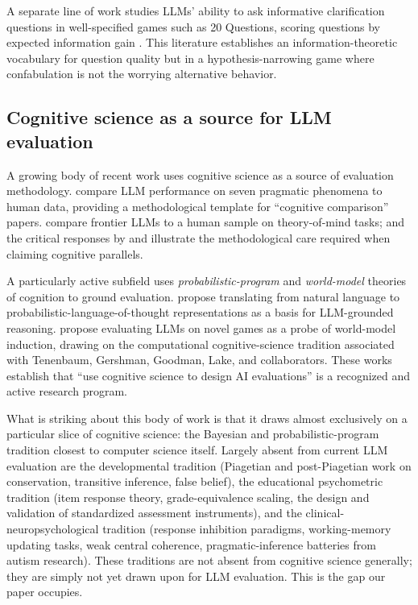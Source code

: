 \documentclass[11pt,letterpaper]{article}
\begin{document}
A separate line of work studies LLMs' ability to ask informative clarification questions in well-specified games such as 20 Questions, scoring questions by expected information gain \citep{mazzaccara2024}. This literature establishes an information-theoretic vocabulary for question quality but in a hypothesis-narrowing game where confabulation is not the worrying alternative behavior.

\subsection{Cognitive science as a source for LLM evaluation}

A growing body of recent work uses cognitive science as a source of evaluation methodology. \citet{hu2023pragmatic} compare LLM performance on seven pragmatic phenomena to human data, providing a methodological template for ``cognitive comparison'' papers. \citet{strachan2024} compare frontier LLMs to a human sample on theory-of-mind tasks; \citet{kosinski2024} and the critical responses by \citet{ullman2023} and \citet{shapira2023} illustrate the methodological care required when claiming cognitive parallels.

A particularly active subfield uses \emph{probabilistic-program} and \emph{world-model} theories of cognition to ground evaluation. \citet{wong2025} propose translating from natural language to probabilistic-language-of-thought representations as a basis for LLM-grounded reasoning. \citet{ying2026} propose evaluating LLMs on novel games as a probe of world-model induction, drawing on the computational cognitive-science tradition associated with Tenenbaum, Gershman, Goodman, Lake, and collaborators. These works establish that ``use cognitive science to design AI evaluations'' is a recognized and active research program.

What is striking about this body of work is that it draws almost exclusively on a particular slice of cognitive science: the Bayesian and probabilistic-program tradition closest to computer science itself. Largely absent from current LLM evaluation are the developmental tradition (Piagetian and post-Piagetian work on conservation, transitive inference, false belief), the educational psychometric tradition (item response theory, grade-equivalence scaling, the design and validation of standardized assessment instruments), and the clinical-neuropsychological tradition (response inhibition paradigms, working-memory updating tasks, weak central coherence, pragmatic-inference batteries from autism research). These traditions are not absent from cognitive science generally; they are simply not yet drawn upon for LLM evaluation. This is the gap our paper occupies.
\end{document}
